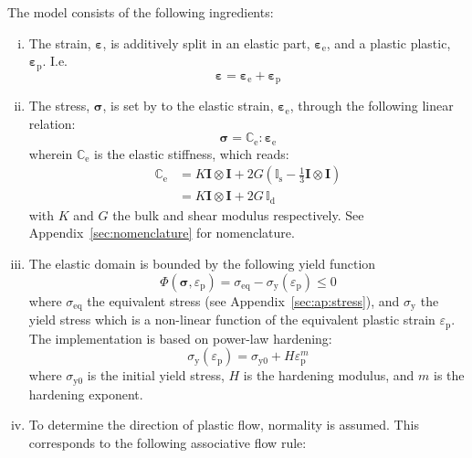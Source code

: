 \documentclass[times,namecite]{goose-article}
\begin{document}
The model consists of the following ingredients:
%
\begin{enumerate}[(i)]
%
\item The strain, $\bm{\varepsilon}$, is additively split in an elastic part, $\bm{\varepsilon}_\mathrm{e}$, and a plastic plastic, $\bm{\varepsilon}_\mathrm{p}$. I.e.
\begin{equation}
  \bm{\varepsilon} = \bm{\varepsilon}_\mathrm{e} + \bm{\varepsilon}_\mathrm{p}
\end{equation}
%
\item The stress, $\bm{\sigma}$, is set by to the elastic strain, $\bm{\varepsilon}_\mathrm{e}$, through the following linear relation:
\begin{equation}\label{eq:model:stress-elas}
  \bm{\sigma} = \mathbb{C}_\mathrm{e} : \bm{\varepsilon}_\mathrm{e}
\end{equation}
wherein $\mathbb{C}_\mathrm{e}$ is the elastic stiffness, which reads:
\begin{align}\label{eq:model:elas}
  \mathbb{C}_\mathrm{e}
  &= K \bm{I} \otimes \bm{I} + 2 G (  \mathbb{I}_\mathrm{s} - \tfrac{1}{3} \bm{I} \otimes \bm{I} )
  \\
  &= K \bm{I} \otimes \bm{I} + 2 G \, \mathbb{I}_\mathrm{d}
\end{align}
with $K$ and $G$ the bulk and shear modulus respectively. See Appendix~\ref{sec:nomenclature} for nomenclature.
%
\item The elastic domain is bounded by the following yield function
\begin{equation}
  \Phi( \bm{\sigma} , \varepsilon_\mathrm{p} )
  =
  \sigma_\mathrm{eq} - \sigma_\mathrm{y} (\varepsilon_\mathrm{p}) \leq 0
\end{equation}
where $\sigma_\mathrm{eq}$ the equivalent stress (see Appendix~\ref{sec:ap:stress}), and $\sigma_\mathrm{y}$ the yield stress which is a non-linear function of the equivalent plastic strain $\varepsilon_\mathrm{p}$. The implementation is based on power-law hardening:
\begin{equation}
  \sigma_\mathrm{y} ( \varepsilon_\mathrm{p} ) = \sigma_\mathrm{y0} + H \varepsilon_\mathrm{p}^m
\end{equation}
where $\sigma_\mathrm{y0}$ is the initial yield stress, $H$ is the hardening modulus, and $m$ is the hardening exponent.
%
\item To determine the direction of plastic flow, normality is assumed. This corresponds to the following associative flow rule:
\begin{equation}

\end{equation}
\end{enumerate}
\end{document}
